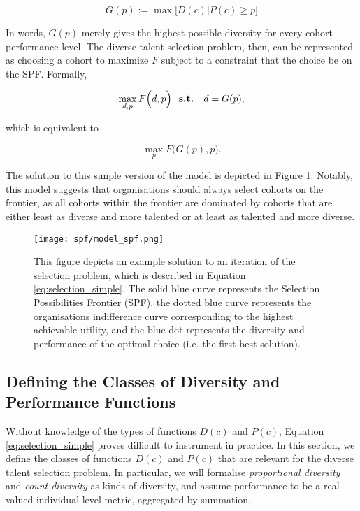 \begin{equation}
G(p) := \max\Big[D(c)|P(c) \geq p\Big]
\end{equation}

\noindent In words, $G(p)$ merely gives the highest possible diversity for every cohort performance level. The diverse talent selection problem, then, can be represented as choosing a cohort to maximize $F$ subject to a constraint that the choice be on the SPF. Formally, 

\begin{equation}
\max_{d,p} F\Big(d,p\Big) \text{ \bf{ s.t. } } d = G(p), \nonumber 
\end{equation}

\noindent which is equivalent to

\begin{equation}
\max_{p} F\Big(G(p) ,p\Big). \label{eq:selection_simple}
\end{equation}

The solution to this simple version of the model is depicted in Figure \ref{fig:model_spf}. Notably, this model suggests that organisations should always select cohorts on the frontier, as all cohorts within the frontier are dominated by cohorts that are either least as diverse and more talented or at least as talented and more diverse.

\begin{figure}[htbp]
    \centering
    \texttt{[image: spf/model\_spf.png]} 
    \caption{This figure depicts an example solution to an iteration of the selection problem, which is described in Equation \ref{eq:selection_simple}. The solid blue curve represents the Selection Possibilities Frontier (SPF), the dotted blue curve represents the organisations indifference curve corresponding to the highest achievable utility, and the blue dot represents the diversity and performance of the optimal choice (i.e. the first-best solution). }
    \label{fig:model_spf}
\end{figure}

\subsection{Defining the Classes of Diversity and Performance Functions}\label{subsubsec:div_talent_def}
Without knowledge of the types of functions $D(c)$ and $P(c)$, Equation \ref{eq:selection_simple} proves difficult to instrument in practice. In this section, we define the classes of functions $D(c)$ and $P(c)$ that are relevant for the diverse talent selection problem. In particular, we will formalise \emph{proportional diversity} and \emph{count diversity} as kinds of diversity, and assume performance to be a real-valued individual-level metric, aggregated by summation.

